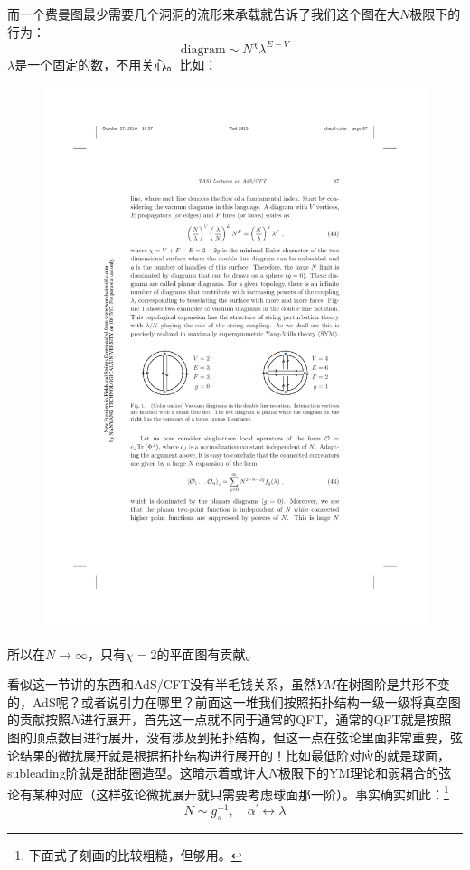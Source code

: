 而一个费曼图最少需要几个洞洞的流形来承载就告诉了我们这个图在大$N$极限下的行为：
\begin{equation}
	\mathrm{diagram}\sim N^{\chi}\lambda^{E-V}
\end{equation}
$\lambda$是一个固定的数，不用关心。比如：
\begin{figure}[H]
	\centering
	\includegraphics{figs/fig17.pdf}
\end{figure}
所以在$N\to\infty$，只有$\chi=2$的平面图有贡献。

看似这一节讲的东西和AdS/CFT没有半毛钱关系，虽然$YM$在树图阶是共形不变的，AdS呢？或者说引力在哪里？前面这一堆我们按照拓扑结构一级一级将真空图的贡献按照$N$进行展开，首先这一点就不同于通常的QFT，通常的QFT就是按照图的顶点数目进行展开，没有涉及到拓扑结构，但这一点在弦论里面非常重要，弦论结果的微扰展开就是根据拓扑结构进行展开的！比如最低阶对应的就是球面，subleading阶就是甜甜圈造型。这暗示着或许大$N$极限下的YM理论和弱耦合的弦论有某种对应（这样弦论微扰展开就只需要考虑球面那一阶）。事实确实如此：\footnote{下面式子刻画的比较粗糙，但够用。}
\begin{equation}
	N\sim g_s^{-1},\quad\alpha^{\prime}\longleftrightarrow\lambda 
\end{equation}

